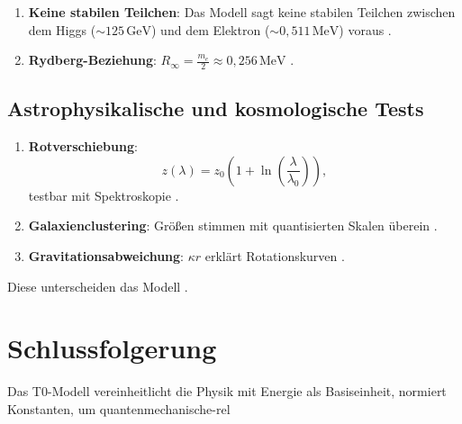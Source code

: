 \documentclass[twocolumn,aps,prl]{revtex4-2}
\begin{document}
		\begin{enumerate}
			\item \textbf{Keine stabilen Teilchen}: Das Modell sagt keine stabilen Teilchen zwischen dem Higgs ($\sim 125 \, \text{GeV}$) und dem Elektron ($\sim 0,511 \, \text{MeV}$) voraus \cite{ATLAS2012, CMS2012, Ellis1976}.
			\item \textbf{Rydberg-Beziehung}: $R_\infty = \frac{m_e}{2} \approx 0,256 \, \text{MeV}$ \cite{Hansch2006, Udem2002}.
		\end{enumerate}
		
		\subsection{Astrophysikalische und kosmologische Tests}
		\label{subsec:astro_tests}
		
		\begin{enumerate}
			\item \textbf{Rotverschiebung}: 
			\begin{equation}
				z(\lambda) = z_0 \left(1 + \ln\left(\frac{\lambda}{\lambda_0}\right)\right), \label{eq:redshift_correction}
			\end{equation}
			testbar mit Spektroskopie \cite{Arp1987, Gardner2006, Dewdney2009}.
			\item \textbf{Galaxienclustering}: Größen stimmen mit quantisierten Skalen überein \cite{Disney2008, Courteau2014, Laureijs2011, Ivezic2019}.
			\item \textbf{Gravitationsabweichung}: $\kappa r$ erklärt Rotationskurven \cite{McGaugh2016, Milgrom1983}.
		\end{enumerate}
		
		Diese unterscheiden das Modell \cite{Popper1959}.
		
		\section{Schlussfolgerung}
		\label{sec:conclusion}
		
		Das T0-Modell vereinheitlicht die Physik mit Energie als Basiseinheit, normiert Konstanten, um quantenmechanische-rel
\end{document}
